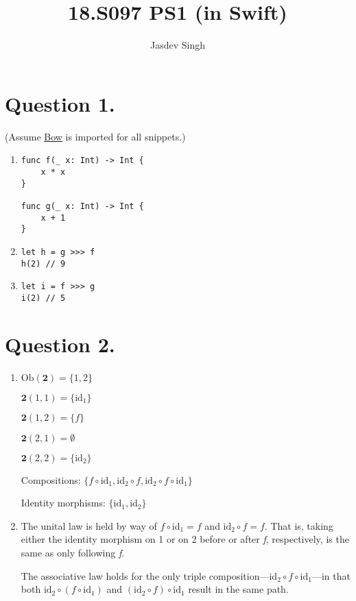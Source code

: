 \documentclass{article}
\title{18.S097 PS1 (in Swift)}
\author{Jasdev Singh}
\begin{document}
\maketitle

\section*{Question 1.}


(Assume \href{https://bow-swift.io}{Bow} is imported for all snippets.)

\begin{enumerate}[label=(\alph*)]

\item
\begin{verbatim}
func f(_ x: Int) -> Int {
	x * x
}

func g(_ x: Int) -> Int {
	x + 1
}
\end{verbatim}

\item
\begin{verbatim}
let h = g >>> f
h(2) // 9
\end{verbatim}

\item
\begin{verbatim}
let i = f >>> g
i(2) // 5
\end{verbatim}

\end{enumerate}

\section*{Question 2.}

\begin{enumerate}[label=(\alph*)]

\item
$\textrm{Ob}(\textbf{2}) = \{1, 2\}$

$\textbf{2}(1, 1) = \{\textrm{id}_{1}\}$

$\textbf{2}(1, 2) = \{\textit{f}\}$

$\textbf{2}(2, 1) = \emptyset$

$\textbf{2}(2, 2) = \{\textrm{id}_{2}\}$

Compositions: $\{f \circ \textrm{id}_{1}, \textrm{id}_{2} \circ f, \textrm{id}_{2} \circ f \circ \textrm{id}_{1}\}$

Identity morphisms: $\{\textrm{id}_{1}, \textrm{id}_{2}\}$

\item

The unital law is held by way of $f \circ \textrm{id}_{1} = f$ and $\textrm{id}_{2} \circ f = f$. That is, taking either the identity morphism on 1 or on 2 before or after \textit{f}, respectively, is the same as only following \textit{f}.

The associative law holds for the only triple composition—$\textrm{id}_{2} \circ f \circ \textrm{id}_{1}$—in that both $\textrm{id}_{2} \circ (f \circ \textrm{id}_{1})$ and $(\textrm{id}_{2} \circ f) \circ \textrm{id}_{1}$ result in the same path.

\end{enumerate}
\end{document}
